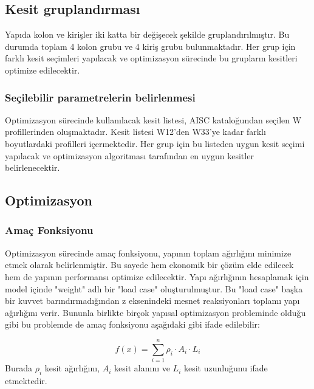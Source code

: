 \subsection{Kesit gruplandırması}
Yapıda kolon ve kirişler iki katta bir değişecek şekilde gruplandırılmıştır. Bu durumda toplam 4 kolon grubu ve 4 kiriş grubu bulunmaktadır. Her grup için farklı kesit seçimleri yapılacak ve optimizasyon sürecinde bu grupların kesitleri optimize edilecektir.

\subsubsection{Seçilebilir parametrelerin belirlenmesi}
Optimizasyon sürecinde kullanılacak kesit listesi, AISC kataloğundan seçilen W profillerinden oluşmaktadır. Kesit listesi W12'den W33'ye kadar farklı boyutlardaki profilleri içermektedir. Her grup için bu listeden uygun kesit seçimi yapılacak ve optimizasyon algoritması tarafından en uygun kesitler belirlenecektir.

\subsection{Optimizasyon}

\subsubsection{Amaç Fonksiyonu}
Optimizasyon sürecinde amaç fonksiyonu, yapının toplam ağırlığını minimize etmek olarak belirlenmiştir. Bu sayede hem ekonomik bir çözüm elde edilecek hem de yapının performansı optimize edilecektir.
Yapı ağırlığının hesaplamak için model içinde "weight" adlı bir "load case" oluşturulmuştur. Bu "load case" başka bir kuvvet barındırmadığından z eksenindeki mesnet reaksiyonları toplamı yapı ağırlığını verir. Bununla birlikte birçok yapısal optimizasyon probleminde olduğu gibi bu problemde de amaç fonksiyonu aşağıdaki gibi ifade edilebilir:

\begin{equation}
    f(x) = \sum_{i=1}^{n} \rho_i \cdot A_i \cdot L_i
\end{equation}
Burada $\rho_i$ kesit ağırlığını, $A_i$ kesit alanını ve $L_i$ kesit uzunluğunu ifade etmektedir. 


